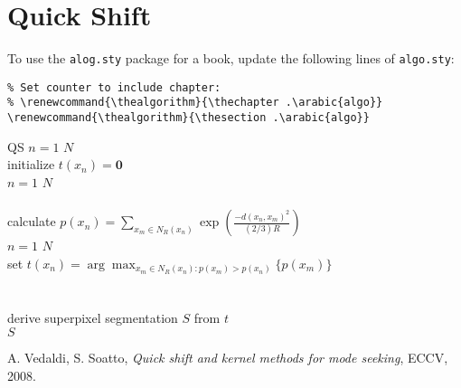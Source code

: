 \documentclass[12pt,a4paper]{article}
\begin{document}
	\section{Quick Shift}

	To use the \lstinline!alog.sty! package for a book, update the following lines of \lstinline!algo.sty!:
	
\begin{lstlisting}
% Set counter to include chapter:
% \renewcommand{\thealgorithm}{\thechapter .\arabic{algo}}
\renewcommand{\thealgorithm}{\thesection .\arabic{algo}}
\end{lstlisting}

	\begin{algorithm}[h]
		\begin{algo}{QS}{\label{algo:related-work-qs}}
			\qfor $n = 1$ \qto $N$\\
				initialize $t(x_n) = \boldsymbol 0$\qrof\\
			\qfor $n = 1$ \qto $N$\\
				\\
				calculate $p(x_n) = \sum_{x_m \in N_R(x_n)} \exp\left(\frac{-d(x_n,x_m)^2}{(2/3) R}\right)$ \qrof\\
			\qfor $n = 1$ \qto $N$\\
				set $t(x_n) = \arg\max_{x_m \in N_R(x_n): p(x_m) > p(x_n)} \{p(x_m)\}$\qrof\\
				\\
			\\
			derive superpixel segmentation $S$ from $t$\\
			\qreturn $S$
		\end{algo}
		\caption{The superpixel algorithm \textbf{QS} proposed in \cite{QuickShift}.}
		\label{fig:related-work-qs-algorithm}
	\end{algorithm}

	\begin{thebibliography}{1}
		A. Vedaldi,
		S. Soatto,
		\emph{Quick shift and kernel methods for mode seeking},
		ECCV,
		2008.
	\end{thebibliography}
\end{document}
